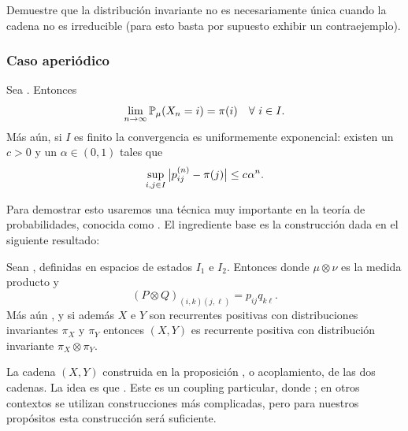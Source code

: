 \begin{exer}
Demuestre que la distribución invariante no es necesariamente única cuando la cadena no es irreducible (para esto basta por supuesto exhibir un contraejemplo).
\end{exer}

\subsubsection{Caso aperiódico}

\begin{thm}\label{thm:equil}
Sea .
Entonces 
\[\lim_{n\to\infty}\mathbb{P}_\mu(X_n=i)=\pi(i)\quad\forall~i\in I.\]
Más aún, si $I$ es finito la convergencia es uniformemente exponencial: existen un $c>0$ y un $\alpha\in(0,1)$ tales que
\[\sup_{i,j\in I}\big|p_{ij}^{(n)}-\pi(j)\big|\leq c\hspace{0.05em}\alpha^n.\]
\end{thm}

Para demostrar esto usaremos una técnica muy importante en la teoría de probabilidades, conocida como \emph{}.
El ingrediente base es la construcción dada en el siguiente resultado:

\begin{prop}\label{prop:couplingMC}
Sean , definidas en espacios de estados $I_1$ e $I_2$.
Entonces  donde $\mu\otimes\nu$ es la medida producto y
\[(P\otimes Q)_{(i,k)(j,\ell)}=p_{ij}q_{k\ell}.\]
Más aún , y si además $X$ e $Y$ son recurrentes positivas con distribuciones invariantes $\pi_X$ y $\pi_Y$ entonces $(X,Y)$ es recurrente positiva con distribución invariante $\pi_X\otimes\pi_Y$.
\end{prop}

\begin{rem}
La cadena $(X,Y)$ construida en la proposición , o acoplamiento, de las dos cadenas.
La idea es que .
Este es un coupling particular, donde ; en otros contextos se utilizan construcciones más complicadas, pero para nuestros propósitos esta construcción será suficiente.
\end{rem}

